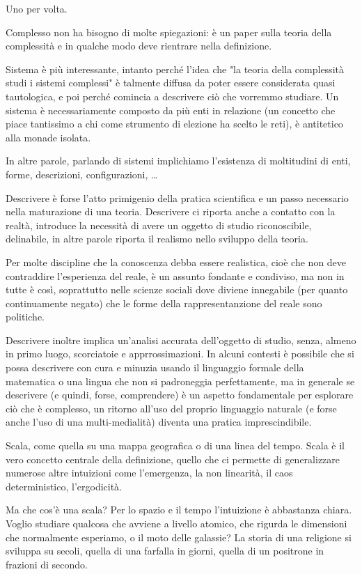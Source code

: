 \documentclass[a4paper, headings=standardclasses]{scrartcl}
\begin{document}
Uno per volta.

Complesso non ha bisogno di molte spiegazioni: è un paper sulla teoria della complessità e in qualche modo deve rientrare nella definizione.

Sistema è più interessante, intanto perché l'idea che "la teoria della complessità studi i sistemi complessi" è talmente diffusa da poter essere considerata quasi tautologica, e poi perché comincia a descrivere ciò che vorremmo studiare.
Un sistema è necessariamente composto da più enti in relazione (un concetto che piace tantissimo a chi come strumento di elezione ha scelto le reti), è antitetico alla monade isolata.

In altre parole, parlando di sistemi implichiamo l'esistenza di moltitudini di enti, forme, descrizioni, configurazioni, \dots

Descrivere è forse l'atto primigenio della pratica scientifica e un passo necessario nella maturazione di una teoria. Descrivere ci riporta anche a contatto con la realtà, introduce la necessità di avere un oggetto di studio riconoscibile, delinabile, in altre parole riporta il realismo nello sviluppo della teoria.

Per molte discipline che la conoscenza debba essere realistica, cioè che non deve contraddire l'esperienza del reale, è un assunto fondante e condiviso, ma non in tutte è così, soprattutto nelle scienze sociali dove diviene innegabile (per quanto continuamente negato) che le forme della rappresentanzione del reale sono politiche.

Descrivere inoltre implica un'analisi accurata dell'oggetto di studio, senza, almeno in primo luogo, scorciatoie e apprrossimazioni. In alcuni contesti è possibile che si possa descrivere con cura e minuzia usando il linguaggio formale della matematica o una lingua che non si padroneggia perfettamente, ma in generale se descrivere (e quindi, forse, comprendere) è un aspetto fondamentale per esplorare ciò che è complesso, un ritorno all'uso del proprio linguaggio naturale (e forse anche l'uso di una multi-medialità) diventa una pratica imprescindibile.

Scala, come quella su una mappa geografica o di una linea del tempo.
Scala è il vero concetto centrale della definizione, quello che ci permette di generalizzare numerose altre intuizioni come l'emergenza, la non linearità, il caos deterministico, l'ergodicità.

Ma che cos'è una scala? Per lo spazio e il tempo l'intuizione è abbastanza chiara. Voglio studiare qualcosa che avviene a livello atomico, che rigurda le dimensioni che normalmente esperiamo, o il moto delle galassie? La storia di una religione si sviluppa su secoli, quella di una farfalla in giorni, quella di un positrone in frazioni di secondo.
\end{document}
